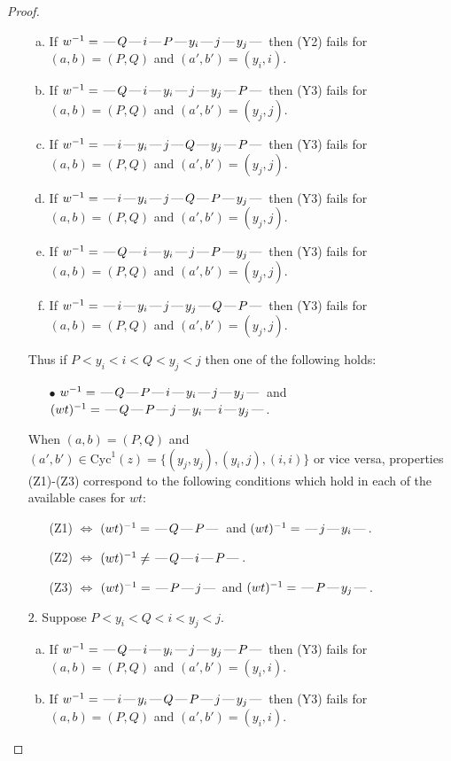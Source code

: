 \documentclass[10pt]{article}
\theoremstyle{definition}
\theoremstyle{definition}
\def\dash{\text{\hspace{0.5mm}---\hspace{0.5mm}}}
\def\Cyc{\mathrm{Cyc}}
\begin{document}
\begin{proof}
\begin{enumerate}
\begin{enumerate}[(a)]
\item If $w^{-1} = \dash Q\dash i\dash P\dash y_i\dash j\dash y_j\dash $ then (Y2) fails for $(a,b)=(P,Q)$ and $(a',b')=(y_i,i)$.
\item If $w^{-1} = \dash Q\dash i\dash y_i\dash j\dash y_j\dash P\dash $ then (Y3) fails for $(a,b)=(P,Q)$ and $(a',b')=(y_j,j)$.
\item If $w^{-1} = \dash i\dash y_i\dash j\dash Q\dash y_j\dash P\dash $ then (Y3) fails for $(a,b)=(P,Q)$ and $(a',b')=(y_j,j)$.
\item If $w^{-1} = \dash i\dash y_i\dash j\dash Q\dash P\dash y_j\dash $ then (Y3) fails for $(a,b)=(P,Q)$ and $(a',b')=(y_j,j)$.
\item If $w^{-1} = \dash Q\dash i\dash y_i\dash j\dash P\dash y_j\dash $ then (Y3) fails for $(a,b)=(P,Q)$ and $(a',b')=(y_j,j)$.
\item If $w^{-1} = \dash i\dash y_i\dash j\dash y_j\dash Q\dash P\dash $ then (Y3) fails for $(a,b)=(P,Q)$ and $(a',b')=(y_j,j)$.
\end{enumerate}
Thus if $P < y_i < i < Q < y_j < j$ then one of the following holds:
\begin{enumerate}
\item[$\bullet$] $w^{-1} = \dash Q\dash P\dash i\dash y_i\dash j\dash y_j\dash $ and $(wt)^{-1} = \dash Q\dash P\dash j\dash y_i\dash i\dash y_j\dash $.
\end{enumerate}
When $(a,b)= (P,Q)$ and $(a',b')\in \Cyc^1(z)=\{(y_j,y_j),(y_i,j),(i,i)\}$ or vice versa,
properties (Z1)-(Z3) correspond to the following conditions which
hold in each of the available cases for $wt$:
\begin{enumerate}
\item[](Z1) $\Leftrightarrow$ $(wt)^{-1} = \dash Q \dash P \dash$  and $(wt)^{-1} = \dash j \dash y_i \dash$.
\item[](Z2) $\Leftrightarrow$ $(wt)^{-1} \neq \dash Q \dash i \dash P \dash$.
\item[](Z3) $\Leftrightarrow$ $(wt)^{-1} = \dash P \dash j \dash$  and $(wt)^{-1} = \dash P \dash y_j \dash$.
\end{enumerate}
\item[$2$.] Suppose $P < y_i < Q < i < y_j < j$.
\begin{enumerate}[(a)]
\item If $w^{-1} = \dash Q\dash i\dash y_i\dash j\dash y_j\dash P\dash $ then (Y3) fails for $(a,b)=(P,Q)$ and $(a',b')=(y_i,i)$.
\item If $w^{-1} = \dash i\dash y_i\dash Q\dash P\dash j\dash y_j\dash $ then (Y3) fails for $(a,b)=(P,Q)$ and $(a',b')=(y_i,i)$.

\end{enumerate}
\end{enumerate}
\end{proof}
\end{document}
